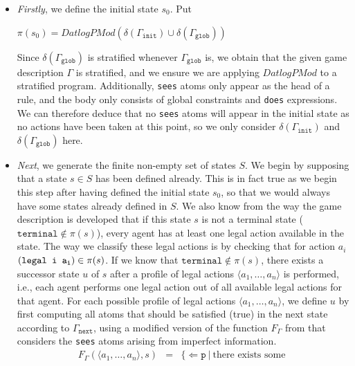 \documentclass{article}
\theoremstyle{theorem}
\theoremstyle{lemma}
\theoremstyle{definition}
\theoremstyle{remark}
\begin{document}
\begin{itemize}
    \item \textit{Firstly}, we define the initial state $s_0$. Put
    \begin{center}
        $\pi(s_{0}) = \textit{DatlogPMod}(\delta(\Gamma_\texttt{init}) \cup \delta(\Gamma_\texttt{glob}))$
    \end{center}
    Since $\delta(\Gamma_\texttt{glob})$ is stratified whenever
    $\Gamma_\texttt{glob}$ is, we obtain that the given game
    description $\Gamma$ is stratified, and we ensure we are applying
    $\textit{DatlogPMod}$ to a stratified program. Additionally,
    \texttt{sees} atoms only appear as the head of a rule, and the
    body only consists of global constraints and \texttt{does}
    expressions. We can therefore deduce that no \texttt{sees} atoms
    will appear in the initial state as no actions have been taken at
    this point, so we only consider $\delta(\Gamma_\texttt{init})$ and
    $\delta(\Gamma_\texttt{glob})$ here.
    \item \textit{Next}, we generate the finite non-empty set of
      states $S$. We begin by supposing that a state $s \in S$ has
      been defined already. This is in fact true as we begin this step
      after having defined the initial state $s_0$, so that we would
      always have some states already defined in $S$. We also know
      from the way the game description is developed that if this
      state $s$ is not a terminal state ($\texttt{terminal} \notin
      \pi(s)$), every agent has at least one legal action available in
      the state. The way we classify these legal actions is by
      checking that for action $a_i$ $(\texttt{legal i
        a\textsubscript{i}}) \in \pi(s)$. If we know that
      $\texttt{terminal} \notin \pi(s)$, there exists a successor
      state $u$ of $s$ after a profile of legal actions $\langle{a_1,
        \ldots, a_n}\rangle$ is performed, i.e., each agent performs
      one legal action out of all available legal actions for that
      agent. For each possible profile of legal actions $\langle{a_1,
        \ldots, a_n}\rangle$, we define $u$ by first computing all
      atoms that should be satisfied (true) in the next state according to $\Gamma_\texttt{next}$, using a modified version of the function
      $F_\Gamma$ from \citep{GDLpaper} that considers the
      \texttt{sees} atoms arising from imperfect information.
      \begin{eqnarray*}
      F_\Gamma(\langle{a_1, \ldots, a_n}\rangle, s) & = & \{\Leftarrow
      \texttt{p}\:|\: \text{there exists some }

\end{eqnarray*}
\end{itemize}
\end{document}
